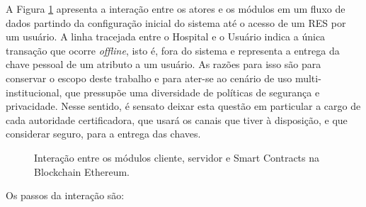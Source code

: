 \documentclass[a4paper,11pt]{article}
\begin{document}


A Figura \ref{fig:diagramaSmartDCPABE} apresenta a interação entre os atores e os módulos em um fluxo de dados partindo da configuração inicial do sistema até o acesso de um RES por um usuário.
A linha tracejada entre o Hospital e o Usuário indica a única transação que ocorre \emph{offline}, isto é, fora do sistema e representa a entrega da chave pessoal de um atributo a um usuário.
As razões para isso são para conservar o escopo deste trabalho e para ater-se ao cenário de uso multi-institucional, que pressupõe uma diversidade de políticas de segurança e privacidade. %
Nesse sentido, é sensato deixar esta questão em particular a cargo de cada autoridade certificadora, que usará os canais que tiver à disposição, e que considerar seguro, para a entrega das chaves.

\begin{figure}[H]
  \centering
  
  \caption{Interação entre os módulos cliente, servidor e Smart Contracts na Blockchain Ethereum.}
  \label{fig:diagramaSmartDCPABE}
\end{figure}

Os passos da interação são:
\end{document}

